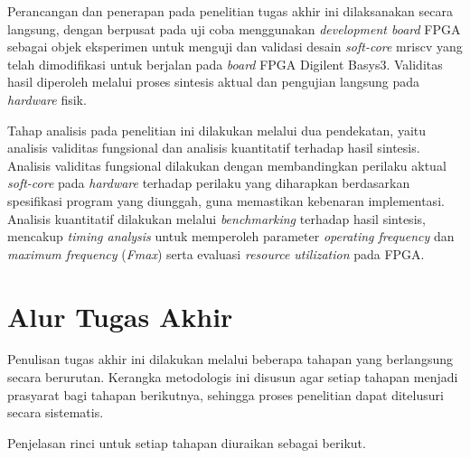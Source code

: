 Perancangan dan penerapan pada penelitian tugas akhir ini dilaksanakan secara langsung, dengan berpusat pada uji coba menggunakan \textit{development board} FPGA sebagai objek eksperimen untuk menguji dan validasi desain \textit{soft-core} mriscv yang telah dimodifikasi untuk berjalan pada \textit{board} FPGA Digilent Basys3. Validitas hasil diperoleh melalui proses sintesis aktual dan pengujian langsung pada \textit{hardware} fisik.

Tahap analisis pada penelitian ini dilakukan melalui dua pendekatan, yaitu analisis validitas fungsional dan analisis kuantitatif terhadap hasil sintesis. Analisis validitas fungsional dilakukan dengan membandingkan perilaku aktual \textit{soft-core} pada \textit{hardware} terhadap perilaku yang diharapkan berdasarkan spesifikasi program yang diunggah, guna memastikan kebenaran implementasi. Analisis kuantitatif dilakukan melalui \textit{benchmarking} terhadap hasil sintesis, mencakup \textit{timing analysis} untuk memperoleh parameter \textit{operating frequency} dan \textit{maximum frequency} (\textit{Fmax}) serta evaluasi \textit{resource utilization} pada FPGA.

\section{Alur Tugas Akhir}
\label{sec:alur-tugas-akhir}

Penulisan tugas akhir ini dilakukan melalui beberapa tahapan yang berlangsung secara berurutan. Kerangka metodologis ini disusun agar setiap tahapan menjadi prasyarat bagi tahapan berikutnya, sehingga proses penelitian dapat ditelusuri secara sistematis.


Penjelasan rinci untuk setiap tahapan diuraikan sebagai berikut.

